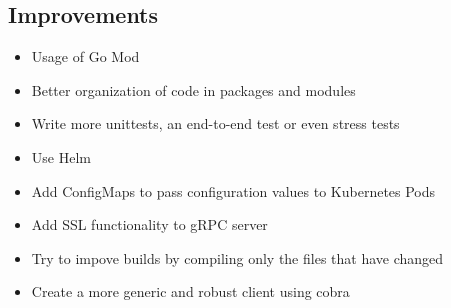 \documentclass[a4paper,10pt]{article}
\begin{document}
\subsection{Improvements}
\begin{itemize}
 \item Usage of Go Mod
 \item Better organization of code in packages and modules
 \item Write more unittests, an end-to-end test or even stress tests
 \item Use Helm
 \item Add ConfigMaps to pass configuration values to Kubernetes Pods
 \item Add SSL functionality to gRPC server
 \item Try to impove builds by compiling only the files that have changed
 \item Create a more generic and robust client using cobra
 
\end{itemize}
\end{document}
